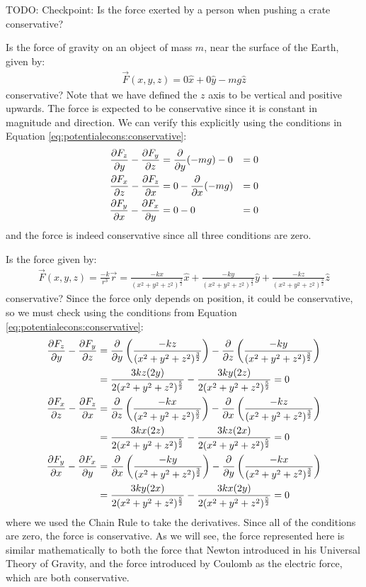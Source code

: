 TODO: Checkpoint: Is the force exerted by a person when pushing a crate conservative?

\begin{example}{\label{ex:potentialecons:gravity}Is the force of gravity on an object of mass $m$, near the surface of the Earth, given by:
\begin{align*}
\vec F(x,y,z) =0\hat x + 0\hat y -mg \hat z
\end{align*}
conservative? Note that we have defined the $z$ axis to be vertical and positive upwards.}
The force is expected to be conservative since it is constant in magnitude and direction. We can verify this explicitly using the conditions in Equation \ref{eq:potentialecons:conservative}:
\begin{align*}
\frac{\partial F_z}{\partial y}-\frac{\partial F_y}{\partial z} &= \frac{\partial }{\partial y}(-mg) - 0 &= 0\\
\frac{\partial F_x}{\partial z}-\frac{\partial F_z}{\partial x} &= 0 - \frac{\partial }{\partial x}(-mg) &= 0\\
\frac{\partial F_y}{\partial x}-\frac{\partial F_x}{\partial y} &= 0 - 0 &=0
\end{align*}
and the force is indeed conservative since all three conditions are zero.
\end{example}


\begin{example}{Is the force given by:
\begin{align*}
\vec F(x,y,z) = \frac{-k}{r^3}\vec r = \frac{-kx}{(x^2+y^2+z^2)^\frac{3}{2}}\hat x + \frac{-ky}{(x^2+y^2+z^2)^\frac{3}{2}}\hat y + \frac{-kz}{(x^2+y^2+z^2)^\frac{3}{2}}\hat z
\end{align*}
conservative?}
Since the force only depends on position, it could be conservative, so we must check using the conditions from Equation \ref{eq:potentialecons:conservative}:
\begin{align*}
\frac{\partial F_z}{\partial y}-\frac{\partial F_y}{\partial z} &= \frac{\partial }{\partial y}\left(\frac{-kz}{(x^2+y^2+z^2)^\frac{3}{2}}\right)-\frac{\partial }{\partial z}\left( \frac{-ky}{(x^2+y^2+z^2)^\frac{3}{2}}\right)\\
&=\frac{3kz(2y)}{2(x^2+y^2+z^2)^\frac{5}{2}}-\frac{3ky(2z)}{2(x^2+y^2+z^2)^\frac{5}{2}} = 0\\
\frac{\partial F_x}{\partial z}-\frac{\partial F_z}{\partial x} &= \frac{\partial }{\partial z}\left(\frac{-kx}{(x^2+y^2+z^2)^\frac{3}{2}}\right)-\frac{\partial }{\partial x}\left( \frac{-kz}{(x^2+y^2+z^2)^\frac{3}{2}}\right)\\
&=\frac{3kx(2z)}{2(x^2+y^2+z^2)^\frac{5}{2}}-\frac{3kz(2x)}{2(x^2+y^2+z^2)^\frac{5}{2}} = 0\\
\frac{\partial F_y}{\partial x}-\frac{\partial F_x}{\partial y} &= \frac{\partial }{\partial x}\left(\frac{-ky}{(x^2+y^2+z^2)^\frac{3}{2}}\right)-\frac{\partial }{\partial y}\left( \frac{-kx}{(x^2+y^2+z^2)^\frac{3}{2}}\right)\\
&=\frac{3ky(2x)}{2(x^2+y^2+z^2)^\frac{5}{2}}-\frac{3kx(2y)}{2(x^2+y^2+z^2)^\frac{5}{2}} = 0
\end{align*}
where we used the Chain Rule to take the derivatives. Since all of the conditions are zero, the force is conservative. As we will see, the force represented here is similar mathematically to both the force that Newton introduced in his Universal Theory of Gravity, and the force introduced by Coulomb as the electric force, which are both conservative.
\end{example}


